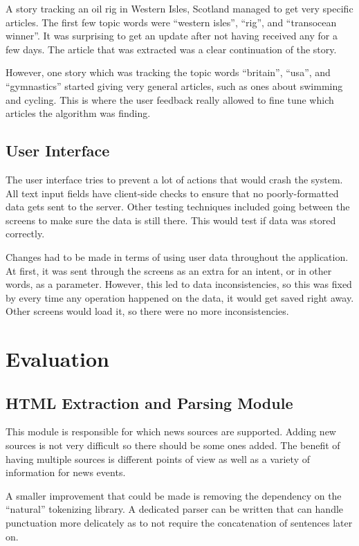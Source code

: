 \documentclass[11pt,titlepage]{report}
\begin{document}
A story tracking an oil rig in Western Isles, Scotland managed to get very specific articles. The first few topic words were ``western isles'', ``rig'', and ``transocean winner''. It was surprising to get an update after not having received any for a few days. The article that was extracted was a clear continuation of the story.

However, one story which was tracking the topic words ``britain'', ``usa'', and ``gymnastics'' started giving very general articles, such as ones about swimming and cycling. This is where the user feedback really allowed to fine tune which articles the algorithm was finding.
\subsection{User Interface}
The user interface tries to prevent a lot of actions that would crash the system. All text input fields have client-side checks to ensure that no poorly-formatted data gets sent to the server. Other testing techniques included going between the screens to make sure the data is still there. This would test if data was stored correctly. 

Changes had to be made in terms of using user data throughout the application. At first, it was sent through the screens as an extra for an intent, or in other words, as a parameter. However, this led to data inconsistencies, so this was fixed by every time any operation happened on the data, it would get saved right away. Other screens would load it, so there were no more inconsistencies.
\section{Evaluation}
\subsection{HTML Extraction and Parsing Module}
This module is responsible for which news sources are supported. Adding new sources is not very difficult so there should be some ones added. The benefit of having multiple sources is different points of view as well as a variety of information for news events.

A smaller improvement that could be made is removing the dependency on the ``natural'' tokenizing library. A dedicated parser can be written that can handle punctuation more delicately as to not require the concatenation of sentences later on.
\end{document}
